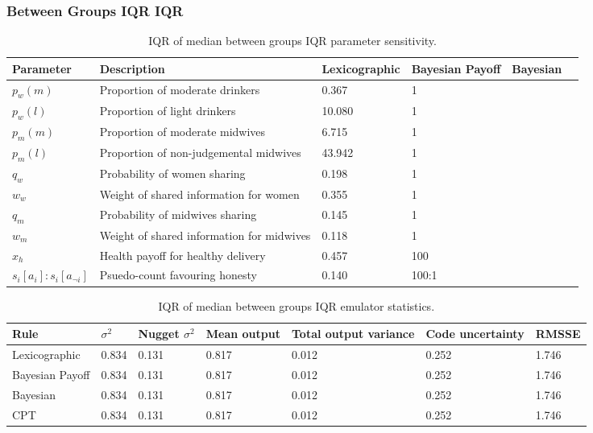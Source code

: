 \subsubsection{Between Groups IQR IQR}

\begin{table}[h!]
\center
\begin{tabular} {|l | l | l | l | l | l |}
\hline
Parameter & Description & Lexicographic & Bayesian Payoff & Bayesian & \ac(CPT) \\ \hline
\(p_{w}(m)\) & Proportion of moderate drinkers & 0.367 & 1 \\ \hline
\(p_{w}(l)\) & Proportion of light drinkers & 10.080 & 1 \\ \hline
\(p_{m}(m)\) & Proportion of moderate midwives & 6.715 & 1 \\ \hline
\(p_{m}(l)\) & Proportion of non-judgemental midwives & 43.942 & 1 \\ \hline
\(q_{w}\) & Probability of women sharing & 0.198 & 1 \\ \hline
\(w_{w}\) & Weight of shared information for women & 0.355 & 1 \\ \hline
\(q_{m}\) & Probability of midwives sharing & 0.145 & 1 \\ \hline
\(w_{m}\) & Weight of shared information for midwives & 0.118 & 1 \\ \hline
\(x_{h}\) & Health payoff for healthy delivery & 0.457 & 100 \\ \hline
\(s_{i}[a_{i}]:s_{i}[a_{\neg i}]\) & Psuedo-count favouring honesty & 0.140 & 100:1 \\ \hline
\end{tabular}
\caption[Table caption text]{IQR of median between groups IQR parameter sensitivity. \label{tab:sa_results_iqr_iqr}}
\end{table}

\begin{table}[h!]
\center
\begin{tabular} {|l | l | l | l | l | l |}
\hline
Rule & \(\sigma^2\) & Nugget \(\sigma^2\) & Mean output & Total output variance & Code uncertainty & RMSSE \\ \hline
Lexicographic & 0.834 & 0.131 &  0.817 & 0.012 & 0.252 & 1.746 \\ \hline
Bayesian Payoff & 0.834 & 0.131 &  0.817 & 0.012 & 0.252 & 1.746 \\ \hline
Bayesian & 0.834 & 0.131 &  0.817 & 0.012 & 0.252 & 1.746 \\ \hline
\ac{CPT} & 0.834 & 0.131 &  0.817 & 0.012 & 0.252 & 1.746 \\ \hline
\end{tabular}
\caption[Table caption text]{IQR of median between groups IQR emulator statistics. \label{tab:sa_emulator_iqr_iqr}}
\end{table}